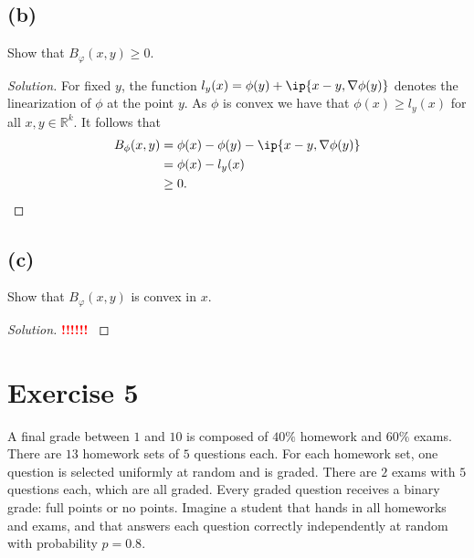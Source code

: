\documentclass[10pt, a4paper, twoside]{amsart}
\newcommand{\R}{\ensuremath{\mathbb{R}}}
\DeclarePairedDelimiter{\ip}\langle\rangle
\newenvironment{solution}
               {\let\oldqedsymbol=\qedsymbol
                \renewcommand{\qedsymbol}{$\blacktriangleleft$}
                \begin{proof}[Solution]}
               {\end{proof}
                \renewcommand{\qedsymbol}{\oldqedsymbol}}
\newcommand{\TODO}{\textcolor{red}{\textbf{!!!!!! }}}
\begin{document}
\subsection*{(b)}
Show that $B_{\varphi}(x,y)\geq 0$.
\begin{solution}
For fixed $y$, the function $l_y(x)=\phi(y)+\ip{x-y, \nabla \phi(y)}$ denotes the linearization of $\phi$ at the point $y$.
As $\phi$ is convex we have that $\phi(x)\geq l_y(x)$ for all $x,y \in \R^k$. 
It follows that 
\begin{align*}
 B_{\phi}(x,y)&=\phi(x)-\phi(y)-\ip{x-y, \nabla \phi(y)} \\
 &=\phi(x)-l_y(x) \\
 &\geq0.
\end{align*}
\end{solution}

\subsection*{(c)}
Show that $B_{\varphi}(x,y)$ is convex in $x$.
\begin{solution}
\TODO 
\end{solution}


\section*{Exercise 5}
A final grade between $1$ and $10$ is composed of $40\%$ homework
and $60\%$ exams. There are $13$ homework sets of $5$ questions each. For
each homework set, one question is selected uniformly at random and is
graded. There are $2$ exams with $5$ questions each, which are all graded.
Every graded question receives a binary grade: full points or no points.
Imagine a student that hands in all homeworks and exams, and that answers 
each question correctly independently at random with probability $p = 0.8$.
\end{document}
